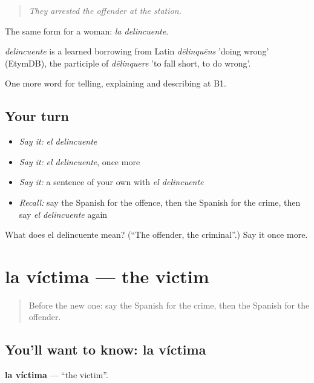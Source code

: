 \begin{quote}
\emph{They arrested the offender at the station.}
\end{quote}

The same form for a woman: \emph{la delincuente}.

\begin{cousinweb}
\emph{delincuente} is a learned borrowing from Latin \emph{dēlinquēns} 'doing wrong' (EtymDB), the participle of \emph{dēlinquere} 'to fall short, to do wrong'.
\end{cousinweb}

\begin{grammarlens}[title={What you've built}]
One more word for telling, explaining and describing at B1.
\end{grammarlens}

\subsection*{Your turn}
\begin{itemize}
\raggedright
  \item \emph{Say it:} \emph{el delincuente}
  \item \emph{Say it:} \emph{el delincuente}, once more
  \item \emph{Say it:} a sentence of your own with \emph{el delincuente}
  \item \emph{Recall:} say the Spanish for the offence, then the Spanish for the crime, then say \emph{el delincuente} again
\end{itemize}

\begin{tcolorbox}[breakable,colback=teal!4,colframe=teal!35!black,title={Before you move on}]
What does el delincuente mean? (\textquotedblleft{}The offender, the criminal\textquotedblright{}.) Say it once more.
\end{tcolorbox}
\section[la víctima]{la víctima — the victim}

\label{lesson:ES-C520-victima}



\begin{quote}
Before the new one: say the Spanish for the crime, then the Spanish for the offender.
\end{quote}

\subsection*{You'll want to know: la víctima}
\textbf{la víctima} — \textquotedblleft{}the victim\textquotedblright{}.

